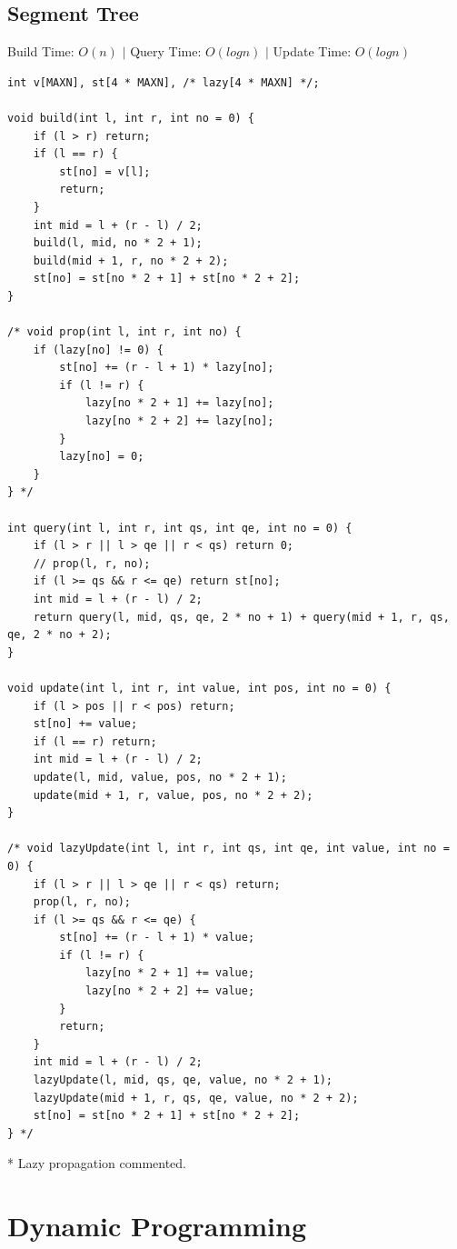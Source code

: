 \documentclass[oneside]{article}
\begin{document}
\subsection{Segment Tree}
Build Time: $O(n)$ $|$ Query Time: $O(logn)$ $|$ Update Time: $O(logn)$
\begin{lstlisting}
int v[MAXN], st[4 * MAXN], /* lazy[4 * MAXN] */;

void build(int l, int r, int no = 0) {
    if (l > r) return;
    if (l == r) {
        st[no] = v[l];
        return;
    }
    int mid = l + (r - l) / 2;
    build(l, mid, no * 2 + 1);
    build(mid + 1, r, no * 2 + 2);
    st[no] = st[no * 2 + 1] + st[no * 2 + 2];
}

/* void prop(int l, int r, int no) {
    if (lazy[no] != 0) {
        st[no] += (r - l + 1) * lazy[no];
        if (l != r) {
            lazy[no * 2 + 1] += lazy[no];
            lazy[no * 2 + 2] += lazy[no];
        }
        lazy[no] = 0;
    }
} */

int query(int l, int r, int qs, int qe, int no = 0) {    
    if (l > r || l > qe || r < qs) return 0;
    // prop(l, r, no);
    if (l >= qs && r <= qe) return st[no];
    int mid = l + (r - l) / 2;
    return query(l, mid, qs, qe, 2 * no + 1) + query(mid + 1, r, qs, qe, 2 * no + 2);
}

void update(int l, int r, int value, int pos, int no = 0) {
    if (l > pos || r < pos) return;
    st[no] += value;
    if (l == r) return;
    int mid = l + (r - l) / 2;
    update(l, mid, value, pos, no * 2 + 1);
    update(mid + 1, r, value, pos, no * 2 + 2);
}

/* void lazyUpdate(int l, int r, int qs, int qe, int value, int no = 0) {
    if (l > r || l > qe || r < qs) return;
    prop(l, r, no);
    if (l >= qs && r <= qe) {
        st[no] += (r - l + 1) * value;
        if (l != r) {
            lazy[no * 2 + 1] += value;
            lazy[no * 2 + 2] += value;
        }
        return;
    }
    int mid = l + (r - l) / 2;
    lazyUpdate(l, mid, qs, qe, value, no * 2 + 1);
    lazyUpdate(mid + 1, r, qs, qe, value, no * 2 + 2);
    st[no] = st[no * 2 + 1] + st[no * 2 + 2];
} */
\end{lstlisting}
* Lazy propagation commented.
\pagebreak
\section{Dynamic Programming}
\end{document}
